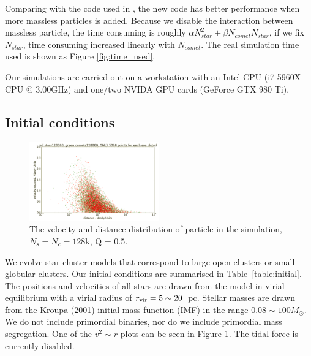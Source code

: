 \documentclass[usenatbib]{mnras}
\newcommand{\rvir}{r_{\rm vir}}
\newcommand{\msun}{M_\odot}
\begin{document}
Comparing with the code used in \citep{Wang:2015ab}, the new code has better performance when more massless particles is added. Because we disable the interaction between massless particle, the time consuming is roughly $\alpha N_{star}^{2}+\beta N_{comet} N_{star}$, if we fix $N_{star}$, time consuming increased linearly with $N_{comet}$. The real simulation time used is shown as Figure \ref{fig:time_used}.


Our simulations are carried out on a workstation with an Intel CPU (i7-5960X CPU @ 3.00GHz) and one/two NVIDA GPU cards (GeForce GTX 980 Ti).

\subsection{Initial conditions}

\begin{figure}
  \centering
  \includegraphics[width=0.5\textwidth,height=!]{v2_r.png}
  \caption{The velocity and distance distribution of particle in the simulation, $N_{s} = N_{c} = 128$k, Q = 0.5.}
  \label{fig:v2_r}
\end{figure}

We evolve star cluster models that correspond to large open clusters or small globular clusters. Our initial conditions are summarised in Table~\ref{table:initial}. 
The positions and velocities of all stars are drawn from the \cite{Plummer:1911aa} model in virial equilibrium with a virial radius of $\rvir=5 \sim 20$~pc. Stellar masses are drawn from the Kroupa (2001) initial mass function (IMF) in the range $0.08 \sim100\msun$. 
We do not include primordial binaries, nor do we include primordial mass segregation. One of the $v^{2} \sim r$ plots can be seen in Figure \ref{fig:v2_r}. The tidal force is currently disabled. %
\end{document}
